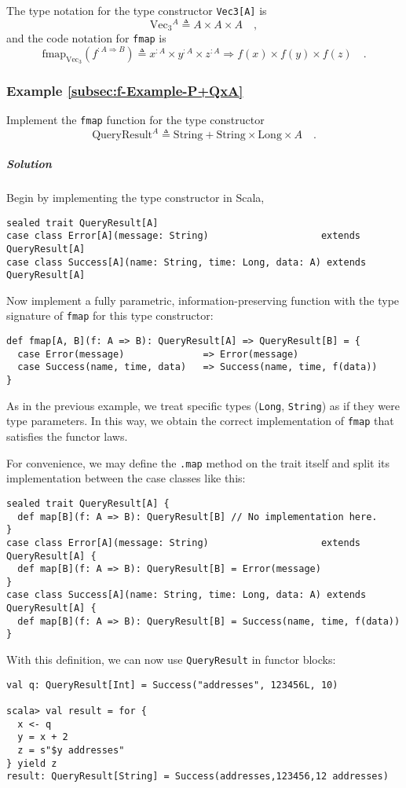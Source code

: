 The type notation for the type constructor \lstinline!Vec3[A]! is
\[
\text{Vec}_{3}{}^{A}\triangleq A\times A\times A\quad,
\]
and the code notation for \lstinline!fmap! is
\[
\text{fmap}_{\text{Vec}_{3}}(f^{:A\Rightarrow B})\triangleq x^{:A}\times y^{:A}\times z^{:A}\Rightarrow f(x)\times f(y)\times f(z)\quad.
\]


\subsubsection{Example \label{subsec:f-Example-P+QxA}\ref{subsec:f-Example-P+QxA}}

Implement the \lstinline!fmap! function for the type constructor
\[
\text{QueryResult}^{A}\triangleq\text{String}+\text{String}\times\text{Long}\times A\quad.
\]


\subparagraph{Solution}

Begin by implementing the type constructor in Scala,
\begin{lstlisting}
sealed trait QueryResult[A]
case class Error[A](message: String)                    extends QueryResult[A]
case class Success[A](name: String, time: Long, data: A) extends QueryResult[A]
\end{lstlisting}
Now implement a fully parametric, information-preserving function
with the type signature of \lstinline!fmap! for this type constructor:
\begin{lstlisting}
def fmap[A, B](f: A => B): QueryResult[A] => QueryResult[B] = {
  case Error(message)              => Error(message)
  case Success(name, time, data)   => Success(name, time, f(data))
}
\end{lstlisting}
As in the previous example, we treat specific types (\lstinline!Long!,
\lstinline!String!) as if they were type parameters. In this way,
we obtain the correct implementation of \lstinline!fmap! that satisfies
the functor laws.

For convenience, we may define the \lstinline!.map! method on the
trait itself and split its implementation between the case classes
like this:
\begin{lstlisting}
sealed trait QueryResult[A] {
  def map[B](f: A => B): QueryResult[B] // No implementation here.
}
case class Error[A](message: String)                    extends QueryResult[A] {
  def map[B](f: A => B): QueryResult[B] = Error(message)
}
case class Success[A](name: String, time: Long, data: A) extends QueryResult[A] {
  def map[B](f: A => B): QueryResult[B] = Success(name, time, f(data))
}
\end{lstlisting}
With this definition, we can now use \lstinline!QueryResult! in functor
blocks:
\begin{lstlisting}
val q: QueryResult[Int] = Success("addresses", 123456L, 10)

scala> val result = for {
  x <- q
  y = x + 2
  z = s"$y addresses"
} yield z
result: QueryResult[String] = Success(addresses,123456,12 addresses)
\end{lstlisting}


